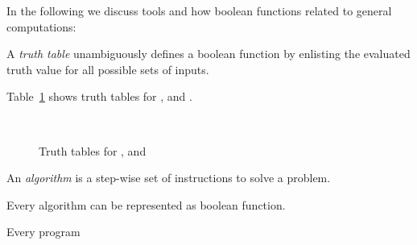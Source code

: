 In the following we discuss tools and how boolean functions related
to general computations:

\begin{defi}
  A \emph{truth table} unambiguously defines a boolean function
  by enlisting the evaluated truth value for all possible sets of
  inputs.

  Table~\ref{tab:andornot-truthtables} shows truth tables for
  ,  and .
\end{defi}

\begin{figure}[!t]
  \centering
  ~
  ~
  \caption{Truth tables for ,  and }
  \label{tab:andornot-truthtables}
\end{figure}

\begin{defi}
  An \emph{algorithm} is a step-wise set of instructions to solve a problem.
\end{defi}

\begin{theorem}
  Every algorithm can be represented as boolean function.
\end{theorem}

Every program



